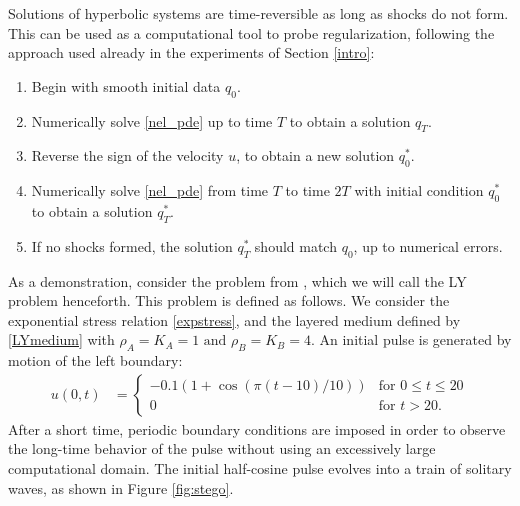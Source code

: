 Solutions of hyperbolic systems are time-reversible as long as shocks
do not form.  This can be used as a computational tool to probe
regularization, following the approach used already in the experiments
of Section \ref{intro}:
\begin{enumerate}
  \item Begin with smooth initial data $q_0$.
  \item Numerically solve \eqref{nel_pde} up to time $T$ to obtain a solution $q_T$.
  \item Reverse the sign of the velocity $u$, to obtain a new solution $q_0^*$.
  \item Numerically solve \eqref{nel_pde} from time $T$ to time $2T$ 
        with initial condition $q_0^*$ to obtain a solution $q_T^*$.
  \item If no shocks formed, the solution $q_T^*$ should match $q_0$, up to
          numerical errors.
\end{enumerate}


As a demonstration, consider the problem from \cite{leveque2003}, 
which we will call the LY problem
henceforth.  This problem is defined as follows.
We consider the exponential stress relation \eqref{expstress}, and the layered 
medium defined by \eqref{LYmedium} with
$\rho_A=K_A=1 \mbox{  and  } \rho_B=K_B=4$.
An initial pulse is generated by motion of the left boundary:
\begin{align*}
u(0,t) & = \begin{cases} 
  -0.1(1+\cos(\pi(t-10)/10)) & \mbox{for } 0\le t\le 20 \\
  0 & \mbox{for } t>20. \end{cases}
\end{align*}
After a short time, periodic boundary conditions are imposed in
order to observe the long-time behavior of the pulse without using
an excessively large computational domain.
The initial half-cosine pulse evolves into a train
of solitary waves, as shown in Figure \ref{fig:stego}.

